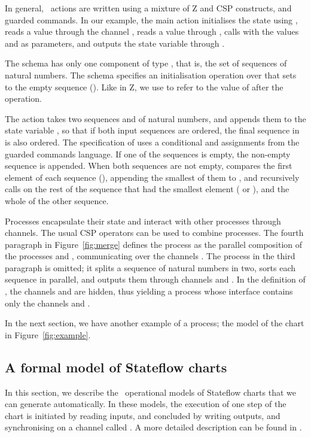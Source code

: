 \documentclass[submission]{eptcs}
\begin{document}
In general, \Circus\ actions are written using a mixture of Z and CSP constructs, and guarded commands. In our example, the main action initialises the state using , reads a value  through the channel , reads a value  through , calls  with the values  and  as parameters, and outputs the state variable  through .

The schema  has only one component  of type , that is, the set of sequences of natural numbers. The schema  specifies an initialisation operation over  that sets  to the empty sequence (). Like in Z, we use  to refer to the value of  after the operation.

The action  takes two sequences  and  of natural numbers, and appends them to the state variable , so that if both input sequences are ordered, the final sequence in  is also ordered. The specification of  uses a conditional and assignments from the guarded commands language. If one of the sequences is empty, the non-empty sequence is appended. When both sequences are not empty,  compares the first element of each sequence (), appending the smallest of them to , and recursively calls  on the rest of the sequence that had the smallest element ( or ), and the whole of the other sequence.

Processes encapsulate their state and interact with other processes through channels. The usual CSP operators can be used to combine processes. The fourth paragraph in Figure~\ref{fig:merge} defines the process  as the parallel composition of the processes  and , communicating over the channels . The process  in the third paragraph is omitted; it splits a sequence of natural numbers in two, sorts each sequence in parallel, and outputs them through channels  and . In the definition of , the channels  and  are hidden, thus yielding a process whose interface contains only the channels  and .

In the next section, we have another example of a process; the model of the chart in Figure~\ref{fig:example}.

\subsection{A formal model of Stateflow charts}
\label{sec:formal-model}

In this section, we describe the \Circus~operational models of Stateflow
charts that we can generate automatically. In these models, 
the execution of one step of the chart is initiated by
reading inputs, and concluded by writing outputs, and synchronising
on a channel called . A more detailed description
can be found in \cite{Miyazawa2011,Miyazawa2011a}.
\end{document}
